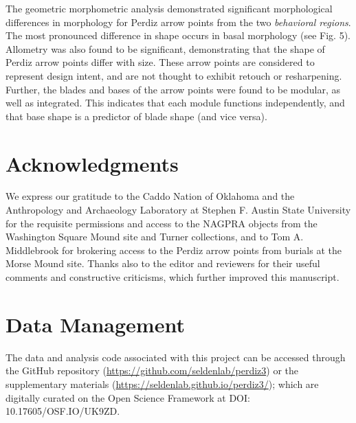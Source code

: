 \documentclass[smallextended]{svjour3}       %
\begin{document}
The geometric morphometric analysis demonstrated significant
morphological differences in morphology for Perdiz arrow points from the
two \emph{behavioral regions}. The most pronounced difference in shape
occurs in basal morphology (see Fig. 5). Allometry was also found to be
significant, demonstrating that the shape of Perdiz arrow points differ
with size. These arrow points are considered to represent design intent,
and are not thought to exhibit retouch or resharpening. Further, the
blades and bases of the arrow points were found to be modular, as well
as integrated. This indicates that each module functions independently,
and that base shape is a predictor of blade shape (and vice versa).

\hypertarget{acknowledgments}{%
\section*{Acknowledgments}\label{acknowledgments}}

We express our gratitude to the Caddo Nation of Oklahoma and the
Anthropology and Archaeology Laboratory at Stephen F. Austin State
University for the requisite permissions and access to the NAGPRA
objects from the Washington Square Mound site and Turner collections,
and to Tom A. Middlebrook for brokering access to the Perdiz arrow
points from burials at the Morse Mound site. Thanks also to the editor
and reviewers for their useful comments and constructive criticisms,
which further improved this manuscript.

\hypertarget{data-management}{%
\section*{Data Management}\label{data-management}}

The data and analysis code associated with this project can be accessed
through the GitHub repository
(\url{https://github.com/seldenlab/perdiz3}) or the supplementary
materials (\url{https://seldenlab.github.io/perdiz3/}); which are
digitally curated on the Open Science Framework at \newline DOI:
10.17605/OSF.IO/UK9ZD.




\end{document}
